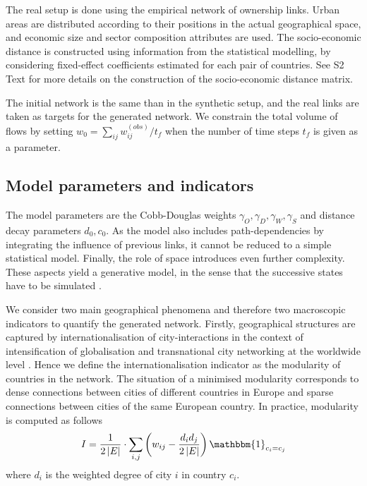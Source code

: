\documentclass[10pt,letterpaper]{article}
\begin{document}
The real setup is done using the empirical network of ownership links. Urban areas are distributed according to their positions in the actual geographical space, and economic size and sector composition attributes are used. The socio-economic distance is constructed using information from the statistical modelling, by considering fixed-effect coefficients estimated for each pair of countries. See S2 Text for more details on the construction of the socio-economic distance matrix.

The initial network is the same than in the synthetic setup, and the real links are taken as targets for the generated network. We constrain the total volume of flows by setting $w_0 = \sum_{ij} w_{ij}^{(obs)} / t_{f}$ when the number of time steps $t_f$ is given as a parameter.

\subsection*{Model parameters and indicators}

The model parameters are the Cobb-Douglas weights $\gamma_O,\gamma_D,\gamma_W,\gamma_S$ and distance decay parameters $d_0,c_0$. As the model also includes path-dependencies by integrating the influence of previous links, it cannot be reduced to a simple statistical model. Finally, the role of space introduces even further complexity. These aspects yield a generative model, in the sense that the successive states have to be simulated \cite{epstein1999agent}.

We consider two main geographical phenomena and therefore two macroscopic indicators to quantify the generated network. Firstly, geographical structures are captured by internationalisation of city-interactions in the context of intensification of globalisation and transnational city networking at the worldwide level \cite{taylor2001specification}. Hence we define the internationalisation indicator as the modularity of countries in the network. The situation of a minimised modularity corresponds to dense connections between cities of different countries in Europe and sparse connections between cities of the same European country. In practice, modularity is computed as follows
\begin{equation}
    I = \frac{1}{2 \left|E\right|} \cdot \sum_{i,j} \left(w_{ij} - \frac{d_i d_j}{2 \left|E\right|}\right) \mathbbm{1}_{c_i = c_j}
\end{equation}
where $d_i$ is the weighted degree of city $i$ in country $c_i$.
\end{document}
